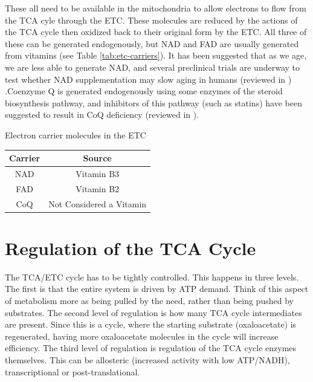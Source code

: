 \documentclass{tufte-handout}
\begin{document}
 These all need to be available in the mitochondria to allow electrons to flow from the TCA cyle through the ETC.  These molecules are reduced by the actions of the TCA cycle then oxidized back to their original form by the ETC.  All three of these can be generated endogenously, but NAD and FAD are usually generated from vitamins (see Table \ref{tab:etc-carriers}).  It has been suggested that as we age, we are less able to generate NAD, and several preclinical trials are underway to test whether NAD supplementation may slow aging in humans (reviewed in \citet{Rajman2018})  .Coenzyme Q is generated endogenously using some enzymes of the steroid biosynthesis pathway, and inhibitors of this pathway (such as statins) have been suggested to result in CoQ deficiency (reviewed in \citet{Quinzii2007}).  

\begin{margintable}
\centering
\caption{Electron carrier molecules in the ETC}
\label{tab:etc-carriers}
\begin{tabular}{cc}
\hline
\textbf {Carrier} & \textbf{Source}\\
\hline
NAD & Vitamin B3 \\
FAD & Vitamin B2  \\
CoQ & Not Considered a Vitamin \\
\hline
\end{tabular}
\end{margintable}


\section{Regulation of the TCA Cycle}

The TCA/ETC cycle has to be tightly controlled.  This happens in three levels.  The first is that the entire system is driven by ATP demand.  Think of this aspect of metabolism more as being pulled by the need, rather than being pushed by substrates.  The second level of regulation is how many TCA cycle intermediates are present.  Since this is a cycle, where the starting substrate (oxaloacetate) is regenerated, having more oxaloacetate molecules in the cycle will increase efficiency.  The third level of regulation is regulation of the TCA cycle enzymes themselves.  This can be allosteric (increased activity with low ATP/NADH), transcriptional or post-translational.
\end{document}
